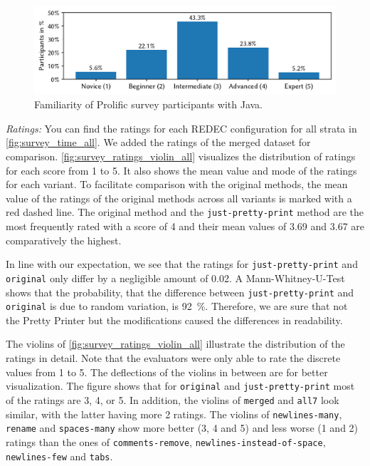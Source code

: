 \documentclass[%
class=scrreprt,
chapterprefix=false,%
open=right,%
twoside=true,%
paper=a4,%
logofile={Logo\_zentral\_farbig\_EN.png},%
thesistype=master,%
UKenglish,%
]{se2thesis}
\theoremstyle{definition}
\newcommand{\rdh}{REDEC\xspace}
\newcommand{\none}{just-pretty-print\xspace} %
\newcommand{\nonet}{\texttt{\none}\xspace} %
\begin{document}
	\begin{figure}[tb]
		\centering
		\includegraphics[width=\textwidth]{img/survey_java_familiarity_bar.pdf}
		\caption{Familiarity of Prolific survey participants with Java.}
		\label{fig:survey_Java_familiarity_pie}
	\end{figure}
		
	\textit{Ratings:}
	You can find the ratings for each \rdh configuration for all strata in \autoref{fig:survey_time_all}. We added the ratings of the merged dataset for comparison. \autoref{fig:survey_ratings_violin_all} visualizes the distribution of ratings for each score from 1 to 5. It also shows the mean value and mode of the ratings for each variant. To facilitate comparison with the original methods, the mean value of the ratings of the original methods across all variants is marked with a red dashed line. The original method and the \texttt{just-pretty-print} method are the most frequently rated with a score of 4 and their mean values of 3.69 and 3.67 are comparatively the highest.
		
	In line with our expectation, we see that the ratings for \nonet and \texttt{original} only differ by a negligible amount of 0.02. A Mann-Whitney-U-Test shows that the probability, that the difference between \nonet and \texttt{original} is due to random variation, is 92~\%.
	Therefore, we are sure that not the Pretty Printer but the modifications caused the differences in readability.
	
	\begin{sloppypar}
	The violins of \autoref{fig:survey_ratings_violin_all} illustrate the distribution of the ratings in detail. Note that the evaluators were only able to rate the discrete values from 1 to 5. The deflections of the violins in between are for better visualization. The figure shows that for \texttt{original} and \texttt{just-pretty-print} most of the ratings are 3, 4, or 5. In addition, the violins of \texttt{merged} and \texttt{all7} look similar, with the latter having more 2 ratings. The violins of \texttt{newlines-many}, \texttt{rename} and \texttt{spaces-many} show more better (3, 4 and 5) and less worse (1 and 2) ratings than the ones of \texttt{comments-remove}, \texttt{newlines-instead-of-space}, \texttt{newlines-few} and \texttt{tabs}.
	\end{sloppypar}
		
\end{document}
